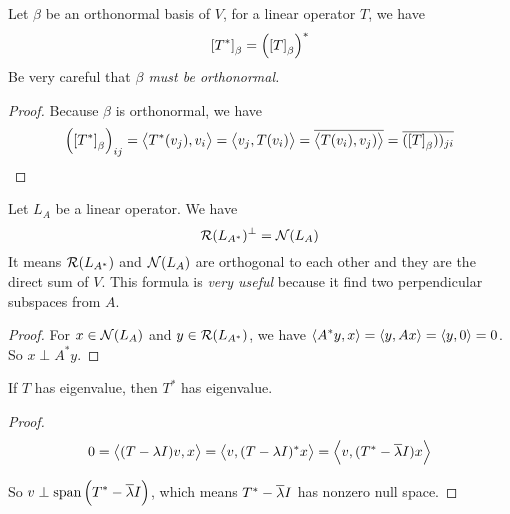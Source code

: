 \begin{theorem}\label{operator_conjugate_transpose_requirement}
    Let $\beta$ be an orthonormal basis of $V$, for a linear operator $T$, we have
    \begin{equation}
        \coordinate{T^*}_\beta = \left(\coordinate{T}_\beta\right)^*
    \end{equation}
    Be very careful that \emph{$\beta$ must be orthonormal.}
\end{theorem}
\begin{proof}
    Because $\beta$ is orthonormal, we have
    \begin{equation*}
        \left(\coordinate{T^*}_\beta\right)_{ij} = \innerproduct{T^* (v_j)}{v_i} = \innerproduct{v_j}{T(v_i)} = \conjugate{\innerproduct{T(v_i)}{v_j)}} = \conjugate{(\coordinate{T}_\beta))_{ji}}
    \end{equation*}
\end{proof}

\begin{theorem}
    Let $L_A$ be a linear operator. We have
    \begin{equation}
        \mathcal{R}(L_{A^*})^\perp = \mathcal{N}(L_A)
    \end{equation}
    It means $\mathcal{R}(L_{A^*})$ and $\mathcal{N}(L_A)$ are orthogonal to each other and they are the direct sum of $V$. This formula is \emph{very useful} because it find two perpendicular subspaces from $A$.
\end{theorem}
\begin{proof}
    For $x \in \mathcal{N}(L_A)$ and $y \in \mathcal{R}(L_{A^*})$, we have $\left\langle \displaystyle A^*y, x \right\rangle = \left\langle \displaystyle y, Ax \right\rangle = \left\langle \displaystyle y, 0 \right\rangle = 0$. So $x \perp A^*y$.
\end{proof}



\begin{theorem}\label{congjugate_transpose_has_eigenvalue}
    If $T$ has eigenvalue, then $T^*$ has eigenvalue.    
\end{theorem}
\begin{proof}
    \begin{equation*}
        0 = \left\langle \displaystyle (T-\lambda I)v, x \right\rangle = \left\langle \displaystyle v, (T-\lambda I)^* x \right\rangle = \left\langle \displaystyle v, (T^* - \overline{\lambda}I) x \right\rangle
    \end{equation*}
    
    So $v \perp \displaystyle \text{span}\left( T^* - \overline{\lambda}I \right)$, which means $T^* - \overline{\lambda}I$ has nonzero null space.
\end{proof}



